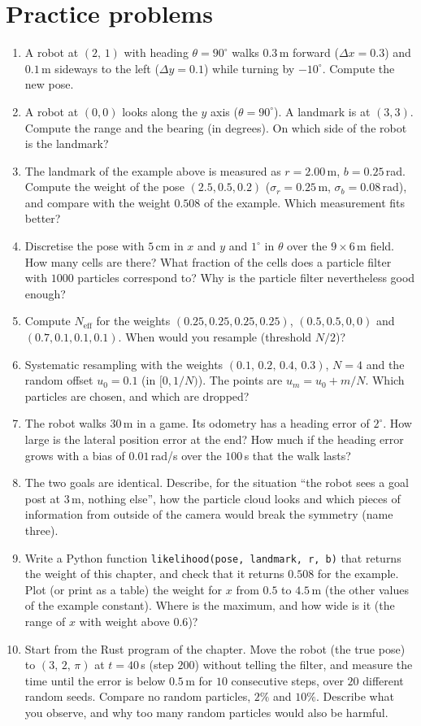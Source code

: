 \section*{Practice problems}
\begin{enumerate}[label=\textbf{\thechapter.\arabic*}]
  \item A robot at $(2,\,1)$ with heading $\theta=90^{\circ}$ walks $0.3$\,m forward ($\Delta x=0.3$) and $0.1$\,m sideways to the left ($\Delta y=0.1$) while turning by $-10^{\circ}$. Compute the new pose.
  \item A robot at $(0,0)$ looks along the $y$ axis ($\theta=90^{\circ}$). A landmark is at $(3,3)$. Compute the range and the bearing (in degrees). On which side of the robot is the landmark?
  \item The landmark of the example above is measured as $r=2.00$\,m, $b=0.25$\,rad. Compute the weight of the pose $(2.5,0.5,0.2)$ ($\sigma_r=0.25$\,m, $\sigma_b=0.08$\,rad), and compare with the weight $0.508$ of the example. Which measurement fits better?
  \item Discretise the pose with $5$\,cm in $x$ and $y$ and $1^{\circ}$ in $\theta$ over the $9\times6$\,m field. How many cells are there? What fraction of the cells does a particle filter with $1000$ particles correspond to? Why is the particle filter nevertheless good enough?
  \item Compute $N_{\text{eff}}$ for the weights $(0.25,0.25,0.25,0.25)$, $(0.5,0.5,0,0)$ and $(0.7,0.1,0.1,0.1)$. When would you resample (threshold $N/2$)?
  \item Systematic resampling with the weights $(0.1,\,0.2,\,0.4,\,0.3)$, $N=4$ and the random offset $u_0=0.1$ (in $[0,1/N)$). The points are $u_m=u_0+m/N$. Which particles are chosen, and which are dropped?
  \item The robot walks $30$\,m in a game. Its odometry has a heading error of $2^{\circ}$. How large is the lateral position error at the end? How much if the heading error grows with a bias of $0.01$\,rad/s over the $100$\,s that the walk lasts?
  \item The two goals are identical. Describe, for the situation ``the robot sees a goal post at $3$\,m, nothing else'', how the particle cloud looks and which pieces of information from outside of the camera would break the symmetry (name three).
  \item Write a Python function \verb!likelihood(pose, landmark, r, b)! that returns the weight of this chapter, and check that it returns $0.508$ for the example. Plot (or print as a table) the weight for $x$ from $0.5$ to $4.5$\,m (the other values of the example constant). Where is the maximum, and how wide is it (the range of $x$ with weight above $0.6$)?
  \item[\textbf{\thechapter.10}$\star$] Start from the Rust program of the chapter. Move the robot (the true pose) to $(3,\,2,\,\pi)$ at $t=40$\,s (step $200$) without telling the filter, and measure the time until the error is below $0.5$\,m for $10$ consecutive steps, over $20$ different random seeds. Compare no random particles, $2\%$ and $10\%$. Describe what you observe, and why too many random particles would also be harmful.
\end{enumerate}
